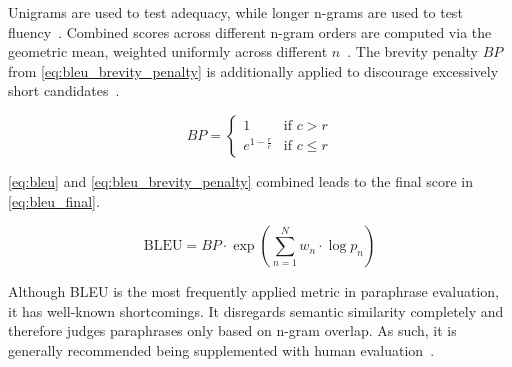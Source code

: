 Unigrams are used to test adequacy, while longer n-grams are used to test fluency~\citep{papineni_bleu_2001}.
Combined scores across different n-gram orders are computed via the geometric mean, weighted uniformly across different $n$~\citep{papineni_bleu_2001,banerjee_METEOR_2005}. 
The brevity penalty $BP$ from \autoref{eq:bleu_brevity_penalty} is additionally applied to discourage excessively short candidates~\citep{papineni_bleu_2001}.

\begin{equation}
    BP = \begin{cases}
        1 & \text{if } c > r \\
        e^{1 - \frac{r}{c}} & \text{if } c \leq r
    \end{cases}
\label{eq:bleu_brevity_penalty}
\end{equation}

\autoref{eq:bleu} and \autoref{eq:bleu_brevity_penalty} combined leads to the final score in \autoref{eq:bleu_final}.

\begin{equation}
    \text{BLEU} = BP \cdot \exp\left(\sum_{n=1}^{N} w_n \cdot \log p_n\right)
\label{eq:bleu_final}
\end{equation}

Although BLEU is the most frequently applied metric in paraphrase evaluation, it has well-known shortcomings. 
It disregards semantic similarity completely and therefore judges paraphrases only based on n-gram overlap. 
As such, it is generally recommended being supplemented with human evaluation~\citep{zhou_paraphrase_2021}.




